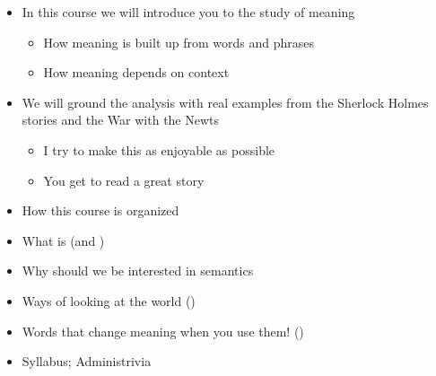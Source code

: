 \documentclass[a4paper,landscape,headrule,footrule,xetex,25pt]{foils}
\begin{document}
\maketitle

%




\begin{itemize}
\item In this course we will introduce you to the study of meaning
  \begin{itemize}
  \item How meaning is built up from words and phrases
  \item How meaning depends on context
  \end{itemize}
\item We will ground the analysis with real examples from the Sherlock Holmes stories and the War with the Newts
  \begin{itemize}
  \item I try to make this as enjoyable as possible
  \item You get to read  a great story
  \end{itemize}
\end{itemize}



\begin{itemize}
\item How this course is organized
\item What is  (and )
\item Why should we be interested in semantics
\item Ways of looking at the world ()
\item Words that change meaning when you use them! ()
\item Syllabus; Administrivia
\end{itemize}




\end{document}
